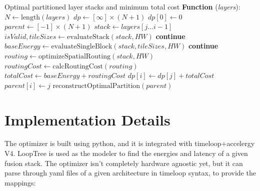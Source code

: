 \documentclass[conference]{IEEEtran}
\begin{document}
\begin{algorithm}[htbp]
\caption{Polyfuse Dynamic Programming Partitioner}
\label{alg:polyfuse_dp}
\begin{algorithmic}[1]
\renewcommand{\algorithmicrequire}{\textbf{Result:}}
\REQUIRE Optimal partitioned layer stacks and minimum total cost
\STATE \textbf{Function} (\textit{layers}):
\STATE $N \leftarrow \text{length}(\textit{layers})$
\STATE $dp \leftarrow [\infty] \times (N + 1)$
\STATE $dp[0] \leftarrow 0$
\STATE $parent \leftarrow [-1] \times (N + 1)$
        \STATE $stack \leftarrow \textit{layers}[j \dots i-1]$
        \STATE $isValid, tileSizes \leftarrow \text{evaluateStack}(stack, HW)$
            \STATE \textbf{continue}
        \ENDIF
        \STATE $baseEnergy \leftarrow \text{evaluateSingleBlock}(stack, tileSizes, HW)$
            \STATE \textbf{continue}
        \ENDIF
        \STATE $routing \leftarrow \text{optimizeSpatialRouting}(stack, HW)$
        \STATE $routingCost \leftarrow \text{calcRoutingCost}(routing)$
        \STATE $totalCost \leftarrow baseEnergy + routingCost$
            \STATE $dp[i] \leftarrow dp[j] + totalCost$
            \STATE $parent[i] \leftarrow j$
        \ENDIF
    \ENDFOR
\ENDFOR
{}
    \RETURN {}
\ENDIF
\STATE \RETURN $\text{reconstructOptimalPartition}(parent)$
\end{algorithmic}
\end{algorithm}

\section{Implementation Details}
The optimizer is built using python, and it is integrated with timeloop+accelergy V4. LoopTree is used as the modeler to find the energies and latency of a given fusion stack. The optimizer isn't completely hardware agnostic yet, but it can parse through yaml files of a given architecture in timeloop syntax, to provide the mappings:
\end{document}
